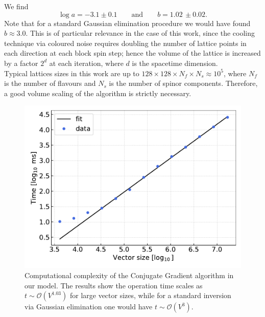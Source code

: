 We find 
\begin{equation*}
    \log a = -3.1 \pm 0.1 \qquad \text{and} \qquad b = 1.02 \, \pm 0.02.
\end{equation*}
Note that for a standard Gaussian elimination procedure we would have found $b \approx 3.0$. This is of particular relevance in the case of this work, since the cooling technique via coloured noise requires doubling the number of lattice points in each direction at each block spin step; hence the volume of the lattice is increased by a factor $2^d$ at each iteration, where $d$ is the spacetime dimension. \\
Typical lattices sizes in this work are up to $128 \times 128 \times N_f \times N_s \approx 10^5$, where $N_f$ is the number of flavours and $N_s$ is the number of spinor components. Therefore, a good volume scaling of the algorithm is strictly necessary.
\begin{figure}[t]
    \centering
    \includegraphics[scale=0.6]{figures/complexity.pdf}
    \caption[Computational complexity of the Conjugate Gradient algorithm.]{Computational complexity of the Conjugate Gradient algorithm in our model. The results show the operation time scales as $t \sim \mathcal{O}(V^{1.03})$ for large vector sizes, while for a standard inversion via Gaussian elimination one would have $t \sim \mathcal{O}(V^3)$.}
    \label{fig:complexity}
\end{figure}

